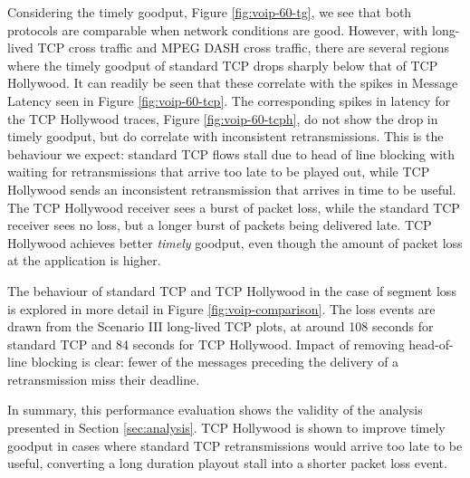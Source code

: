 Considering the timely goodput, Figure \ref{fig:voip-60-tg}, we see that
both protocols are comparable when network conditions
are good. However, with long-lived TCP cross traffic and MPEG DASH cross
traffic, there are several regions where the timely goodput of standard
TCP drops sharply below that of TCP Hollywood. It can readily be seen 
that these correlate with the spikes in Message Latency seen in Figure
\ref{fig:voip-60-tcp}. The corresponding spikes in latency for the TCP
Hollywood traces, Figure \ref{fig:voip-60-tcph}, do not show the drop
in timely goodput, but do correlate with inconsistent retransmissions.
This is the behaviour we expect: standard TCP flows stall due to head
of line blocking with waiting for retransmissions that arrive too late
to be played out, while TCP Hollywood sends an inconsistent retransmission
that arrives in time to be useful. The TCP Hollywood receiver sees a burst
of packet loss, while the standard TCP receiver sees no loss, but a longer
burst of packets being delivered late. TCP Hollywood achieves better
\emph{timely} goodput, even though the amount of packet loss at the
application is higher. 

The behaviour of standard TCP and TCP Hollywood in the case of segment loss
is explored in more detail in Figure \ref{fig:voip-comparison}.  The loss
events are drawn from the Scenario III long-lived TCP plots, at around 108
seconds for standard TCP and 84 seconds for TCP Hollywood.  
Impact of removing head-of-line blocking is clear: fewer of the messages
preceding the delivery of a retransmission miss their deadline.

% 
% 
% 
%   


In summary, this performance evaluation shows the validity of the
analysis presented in Section \ref{sec:analysis}. TCP Hollywood is shown
to improve timely goodput in cases where standard TCP retransmissions would
arrive too late to be useful, converting a long duration playout stall into 
a shorter packet loss event.

